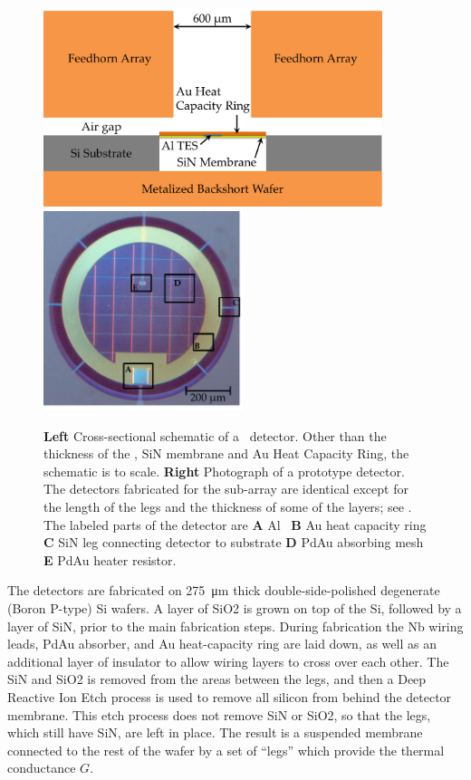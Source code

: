 \begin{figure}
\centering
\includegraphics[width=3.9in]{images/ch5-det-schematic.png}
\includegraphics[width=2.3in]{images/ch5-proto-pixel-labeled.png}
\caption[Detector cross-section and photograph]{
  \textbf{Left} Cross-sectional schematic of a \Imager\ detector.
  Other than the thickness of the \TES, SiN membrane and Au Heat Capacity Ring, the schematic is to scale.
  \textbf{Right} Photograph of a prototype detector.
  The detectors fabricated for the sub-array are identical except for the length of the legs and the thickness of some of the layers; see .
  The labeled parts of the detector are \textbf{A} Al \TES\ \textbf{B} Au heat capacity ring \textbf{C} SiN leg connecting detector to substrate \textbf{D} PdAu absorbing mesh \textbf{E} PdAu heater resistor.
}
\label{fig:ch5-det-layout}
\end{figure}

The detectors are fabricated on \SI{275}{\um} thick double-side-polished degenerate (Boron P-type) Si wafers.
A layer of SiO2 is grown on top of the Si, followed by a layer of SiN, prior to the main fabrication steps.
During fabrication the Nb wiring leads, PdAu absorber, and Au heat-capacity ring are laid down, as well as an additional layer of insulator to allow wiring layers to cross over each other.
The SiN and SiO2 is removed from the areas between the legs, and then a Deep Reactive Ion Etch process is used to remove all silicon from behind the detector membrane.
This etch process does not remove SiN or SiO2, so that the legs, which still have SiN, are left in place.
The result is a suspended membrane connected to the rest of the wafer by a set of ``legs'' which provide the thermal conductance $G$.

